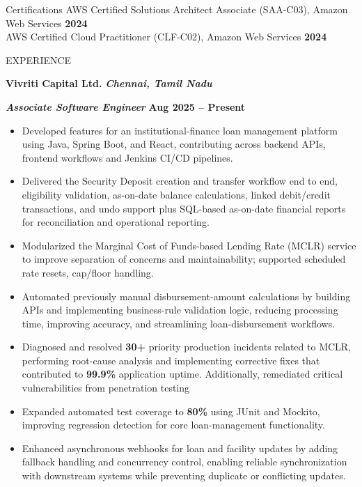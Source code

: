 \documentclass{resume}
\begin{document}
\vspace{-0.8em} 
\begin{rSection}{Certifications}
AWS Certified Solutions Architect Associate (SAA-C03), Amazon Web Services \hfill \textbf{2024} \\
AWS Certified Cloud Practitioner (CLF-C02), Amazon Web Services \hfill \textbf{2024}
\end{rSection}


\vspace{-0.8em} 
\begin{rSection}{EXPERIENCE}

\textbf{Vivriti Capital Ltd.} \hfill \textbf{\textit{Chennai, Tamil Nadu}}

\textbf{\textit{Associate Software Engineer}} \hfill \textbf{Aug 2025 -- Present}
\begin{itemize}
\itemsep -3pt {}
\item Developed features for an institutional-finance loan management platform using Java, Spring Boot, and React, contributing across backend APIs, frontend workflows and Jenkins CI/CD pipelines.
\item Delivered the Security Deposit creation and transfer workflow end to end, eligibility validation, as-on-date balance calculations, linked debit/credit transactions, and undo support plus SQL-based as-on-date financial reports for reconciliation and operational reporting.
\item Modularized the Marginal Cost of Funds-based Lending Rate (MCLR) service to improve separation of concerns and maintainability; supported scheduled rate resets, cap/floor handling.
\item Automated previously manual disbursement-amount calculations by building APIs and implementing business-rule validation logic, reducing processing time, improving accuracy, and streamlining loan-disbursement workflows.
\item Diagnosed and resolved \textbf{30+} priority production incidents related to MCLR, performing root-cause analysis and implementing corrective fixes that contributed to \textbf{99.9\%} application uptime. Additionally, remediated critical vulnerabilities from penetration testing
\item Expanded automated test coverage to \textbf{80\%} using JUnit and Mockito, improving regression detection for core loan-management functionality.
\item Enhanced asynchronous webhooks for loan and facility updates by adding fallback handling and concurrency control, enabling reliable synchronization with downstream systems while preventing duplicate or conflicting updates.


\end{itemize}
\end{rSection}
\end{document}
